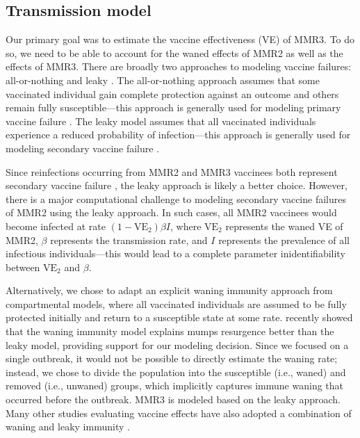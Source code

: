 \documentclass[12pt]{article}
\begin{document}
\subsection{Transmission model}

Our primary goal was to estimate the vaccine effectiveness (VE) of MMR3.
To do so, we need to be able to account for the waned effects of MMR2 as well as the effects of MMR3.
There are broadly two approaches to modeling vaccine failures: all-or-nothing and leaky \citep{smith1984assessment}.
The all-or-nothing approach assumes that some vaccinated individual gain complete protection against an outcome and others remain fully susceptible---this approach is generally used for modeling primary vaccine failure \citep{kanaan2002estimation}.
The leaky model assumes that all vaccinated individuals experience a reduced probability of infection---this approach is generally used for modeling secondary vaccine failure \citep{gokhale2023disentangling}.

Since reinfections occurring from MMR2 and MMR3 vaccinees both represent secondary vaccine failure \citep{vygen2016waning,kaaijk2020third,lam2020mumps}, the leaky approach is likely a better choice.
However, there is a major computational challenge to modeling secondary vaccine failures of MMR2 using the leaky approach.
In such cases, all MMR2 vaccinees would become infected at rate $(1-\mathrm{VE}_2) \beta I$, where $\mathrm{VE}_2$ represents the waned VE of MMR2, $\beta$ represents the transmission rate, and $I$ represents the prevalence of all infectious individuals---this would lead to a complete parameter inidentifiability between $\mathrm{VE}_2$ and $\beta$.

Alternatively, we chose to adapt an explicit waning immunity approach from compartmental models, where all vaccinated individuals are assumed to be fully protected initially and return to a susceptible state at some rate.
\cite{gokhale2023disentangling} recently showed that the waning immunity model explains mumps resurgence better than the leaky model, providing support for our modeling decision.
Since we focused on a single outbreak, it would not be possible to directly estimate the waning rate;
instead, we chose to divide the population into the susceptible (i.e., waned) and removed (i.e., unwaned) groups, which implicitly captures immune waning that occurred before the outbreak.
MMR3 is modeled based on the leaky approach.
Many other studies evaluating vaccine effects have also adopted a combination of waning and leaky immunity \citep{marziano2021effect,gokhale2023disentangling,yang2024assessing}.
\end{document}

